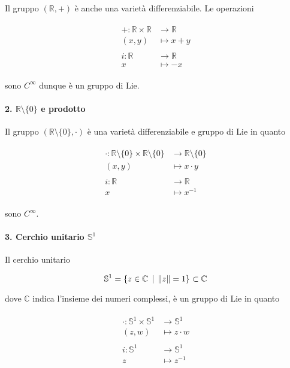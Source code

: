 Il gruppo $ (\mathbb{R},+) $ è anche una varietà differenziabile. Le operazioni

\begin{align}
	\begin{split}
		+ : \mathbb{R} \times \mathbb{R} &\to \mathbb{R}\\
		(x,y) &\mapsto x+y\\\\
		i : \mathbb{R} &\to \mathbb{R}\\
		x &\mapsto - x
	\end{split}
\end{align}

sono $ C^{\infty} $ dunque è un gruppo di Lie.

\paragraph{2. $ \mathbb{R} \setminus \{0\} $ e prodotto}

Il gruppo $ (\mathbb{R} \setminus \{0\},\cdot) $ è una varietà differenziabile e gruppo di Lie in quanto

\begin{align}
	\begin{split}
		\cdot : \mathbb{R} \setminus \{0\} \times \mathbb{R} \setminus \{0\} &\to \mathbb{R} \setminus \{0\}\\
		(x,y) &\mapsto x \cdot y\\\\
		i : \mathbb{R} &\to \mathbb{R}\\
		x &\mapsto x^{-1}
	\end{split}
\end{align}

sono $ C^{\infty} $.

\paragraph{3. Cerchio unitario $ \mathbb{S}^{1} $}

Il cerchio unitario

\begin{equation}
	\mathbb{S}^{1} = \{ z \in \mathbb{C} \, \mid \, \norm{z} = 1 \} \subset \mathbb{C}
\end{equation}

dove $ \mathbb{C} $ indica l'insieme dei numeri complessi, è un gruppo di Lie in quanto

\begin{align}
	\begin{split}
		\cdot : \mathbb{S}^{1} \times \mathbb{S}^{1} &\to \mathbb{S}^{1}\\
		(z,w) &\mapsto z \cdot w\\\\
		i : \mathbb{S}^{1} &\to \mathbb{S}^{1}\\
		z &\mapsto z^{-1}
	\end{split}
\end{align}

